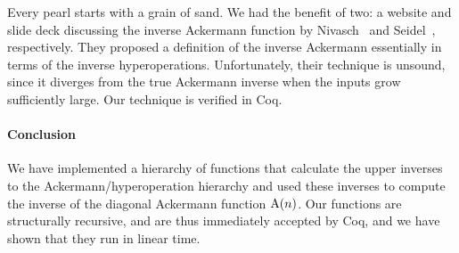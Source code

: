 Every pearl starts with a grain of sand.  We had the benefit of two: a website and slide deck 
discussing the inverse Ackermann function by Nivasch~\cite{nivasch} and Seidel~\cite{seidel},
respectively.  They proposed a definition of the inverse Ackermann essentially in terms of
the inverse hyperoperations.  Unfortunately, their technique is unsound, since it diverges from
the true Ackermann inverse when the inputs grow sufficiently large.  Our technique is verified in Coq.

\paragraph*{Conclusion}
We have implemented a hierarchy of functions that calculate the upper inverses
to the Ackermann/hyperoperation hierarchy and used these inverses
to compute the inverse of the diagonal Ackermann function $\text{A}(n)$.
Our functions are structurally recursive, and are thus immediately accepted by Coq,
and we have shown that they run in linear time.







